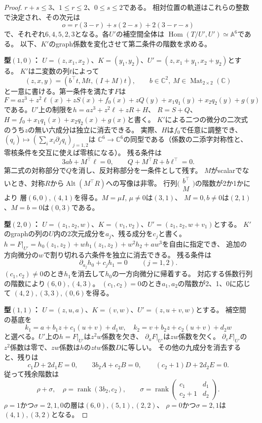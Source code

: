 \documentclass[11pt,a4paper]{ltjsarticle}
\newcommand{\C}{\mathbb C}
\newcommand{\rk}{\operatorname{rank}}
\begin{document}
\begin{proof}
$r+s\le3$、$1\le r\le2$、$0\le s\le2$である。
相対位置の軌道はこれらの整数で決定され、その次元は
\begin{equation}\label{eq:orbit}
 o=r(3-r)+s(2-s)+2(3-r-s)
\end{equation}
で、それぞれ$6,4,5,2,3$となる。各$U'$の補空間全体は
$\operatorname{Hom}(T/U',U')\simeq\mathbb A^6$である。
以下、$K'$のgraph係数を変化させて第二条件の階数を求める。

\smallskip\noindent\textbf{型$(1,0)$：}
$U=(z,x_1,x_2)$、$K=(y_1,y_2)$、$U'=(z,x_1+y_1,x_2+y_2)$とする。
$K'$は二変数の列$t$によって
\[
 (z,x,y)=(b^\top t,Mt,(I+M)t),\qquad b\in\C^2,\ M\in\operatorname{Mat}_{2\times2}(\C)
\]
と一意に書ける。第一条件を満たす$F$は
\[
 F=az^3+z^2\ell(x)+zS(x)+f_0(x)+zQ(y)
    +x_1q_1(y)+x_2q_2(y)+g(y)
\]
である。$U'$上の制限を$h=az^3+z^2\ell+zR+H$、
$R=S+Q$、$H=f_0+x_1q_1(x)+x_2q_2(x)+g(x)$と書く。
$K'$による二つの微分の二次式のうち$z$の無い六成分は独立に消去できる。
実際、$H$は$f_0$で任意に調整でき、
$(q_i)\mapsto(\sum_i x_i\partial_jq_i)_{j=1,2}$は
$\C^6\to\C^6$の同型である（係数の二添字対称性と、零核条件を交互に使えば零核になる）。
残る条件は
\begin{equation}\label{eq:r10}
 3ab+M^\top\ell=0,\qquad Q+M^\top R+b\ell^\top=0.
\end{equation}
第二式の対称部分で$Q$を消し、反対称部分を一条件として残す。
$M$がscalarでないとき、対称$R$から$\operatorname{Alt}(M^\top R)$への写像は非零。
行列$\bigl(\begin{smallmatrix}b^\top\\M\end{smallmatrix}\bigr)$の階数が2か1かにより
層$(6,0),(4,1)$を得る。$M=\mu I$, $\mu\ne0$は$(3,1)$、
$M=0,b\ne0$は$(2,1)$、$M=b=0$は$(0,3)$である。

\smallskip\noindent\textbf{型$(2,0)$：}
$U=(z_1,z_2,w)$、$K=(v_1,v_2)$、$U'=(z_1,z_2,w+v_1)$とする。
$K'$のgraphの列の$U$内の2次元成分を$a_j$、残る成分を$c_j$と書く。
$h=F|_{U'}=h_0(z_1,z_2)+wh_1(z_1,z_2)+w^2h_2+aw^3$を自由に指定でき、
追加の方向微分の$w$で割り切れる六条件を独立に消去できる。
残る条件は
\begin{equation}\label{eq:r20}
 \partial_{a_j}h_0+c_jh_1=0\qquad (j=1,2).
\end{equation}
$(c_1,c_2)\ne0$のとき$h_1$を消去して$h_0$の一方向微分に帰着する。
対応する係数行列の階数により$(6,0),(4,3)$。
$(c_1,c_2)=0$のとき$a_1,a_2$の階数が2、1、0に応じて
$(4,2),(3,3),(0,6)$を得る。

\smallskip\noindent\textbf{型$(1,1)$：}
$U=(z,u,a)$、$K=(v,w)$、$U'=(z,u+v,w)$とする。
補空間の基底を
\[
 k_1=a+b_1z+c_1(u+v)+d_1w,\quad
 k_2=v+b_2z+c_2(u+v)+d_2w
\]
と選べる。$U'$上の$h=F|_{U'}$は$z^2w$係数を欠き、
$\partial_aF|_{U'}$は$zw$係数を欠く。
$\partial_vF|_{U'}$の$z^2$係数は零で、$zw$係数は$h$の$ztw$係数$D$に等しい。
その他の九成分を消去すると、残りは
\[
 c_1D+2d_1E=0,\qquad 3b_2A+c_2B=0,\qquad(c_2+1)D+2d_2E=0.
\]
従って残余階数は
\[
 \rho+\sigma,\quad \rho=\rk(3b_2,c_2),\qquad
 \sigma=\rk\begin{pmatrix}c_1&d_1\\ c_2+1&d_2\end{pmatrix}.
\]
$\rho=1$かつ$\sigma=2,1,0$の層は$(6,0),(5,1),(2,2)$、
$\rho=0$かつ$\sigma=2,1$は$(4,1),(3,2)$となる。


\end{proof}
\end{document}

